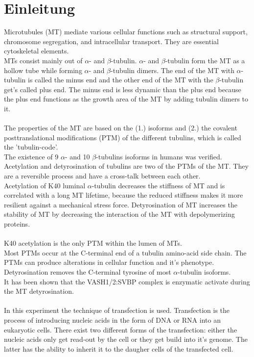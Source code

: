 \pagestyle{headings}
\setcounter{page}{1}

\section{Einleitung}

Microtubules (MT) mediate various cellular functions such as structural support, chromosome segregation, and intracellular transport. \cite{bar2022direct} They are essential cytoskeletal elements. \\
MTs consist mainly out of $\alpha$- and $\beta$-tubulin. 
$\alpha$- and $\beta$-tubulin form the MT as a hollow tube while forming  $\alpha$- and $\beta$-tubulin dimers. The end of the MT with $\alpha$-tubulin is called the minus end and the other end of the MT with the $\beta$-tubulin get's called plus end. The minus end is less dynamic than the plus end because the plus end functions as the growth area of the MT by adding tubulin dimers to it. \\\\
The properties of the MT are based on the (1.) isoforms and (2.) the covalent posttranslational modifications (PTM) of the different tubulins, which is called the 'tubulin-code'.\\
The existence of 9 $\alpha$- and 10 $\beta$-tubulins isoforms in humans was verified.\\
Acetylation and detyrosination of tubulins are two of the PTMs of the MT. They are a reversible process and have a cross-talk between each other.\\
Acetylation of K40 luminal $\alpha $-tubulin decreases the stiffness of MT and is correlated with a long MT lifetime, because the reduced stiffness makes it more resilient against a mechanical stress force. Detyrosination of MT increases the stability of MT by decreasing the interaction of the MT with depolymerizing proteins. \\\\
K40 acetylation is the only PTM within the lumen of MTs. \\
Most PTMs occur at the C-terminal end of a tubulin amino-acid side chain. The PTMs  can produce alterations in cellular function and it's phenotype. \cite{seet2006reading} Detyrosination removes the C-terminal tyrosine of most $\alpha$-tubulin isoforms. \\
It has been shown that the VASH1/2:SVBP complex is enzymatic activate during the MT detyrosination. \\\\
In this experiment the technique of transfection is used. Transfection is the process of introducing nucleic acids in the form of DNA or RNA into an eukaryotic cells. There exist two different forms of the transfection: either the nucleic acids only get read-out by the cell or they get build into it's genome. The latter has the ability to inherit it to the daugher cells of the transfected cell. 



